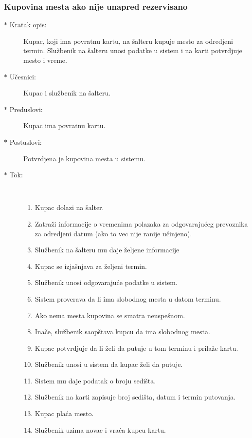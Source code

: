 \subsubsection{Kupovina mesta ako nije unapred rezervisano}
\begin{description}
	\item[$\ast$ Kratak opis: ] Kupac, koji ima povratnu kartu, na \v salteru kupuje mesto za odredjeni termin. Slu\v zbenik na \v salteru unosi podatke u sistem i na karti potvrdjuje mesto i vreme.
	\item[$\ast$ U\v cesnici: ] Kupac i slu\v zbenik na \v salteru.
	\item[$\ast$ Preduslovi: ] Kupac ima povratnu kartu.
	\item[$\ast$ Postuslovi: ] Potvrdjena je kupovina mesta u sistemu.
	\item[$\ast$ Tok: ] \ \\
	\begin{enumerate}
		\item Kupac dolazi na \v salter.
		\item Zatra\v zi informacije o vremenima polazaka za odgovaraju\'ceg prevoznika za odredjeni datum (ako to vec nije ranije u\v cinjeno).
		\item Slu\v zbenik na \v salteru mu daje \v zeljene informacije
		\item Kupac se izja\v snjava za \v zeljeni termin.
		\item Slu\v zbenik unosi odgovaraju\'ce podatke u sistem.
		\item Sistem proverava da li ima slobodnog mesta u datom terminu.
		\item Ako nema mesta kupovina se smatra neuspe\v snom.
		\item Ina\v ce, slu\v zbenik saop\v stava kupcu da ima slobodnog mesta.
		\item Kupac potvrdjuje da li \v zeli da putuje u tom terminu i prila\v ze kartu.
		\item Slu\v zbenik unosi u sistem da kupac \v zeli da putuje.
		\item Sistem mu daje podatak o broju sedi\v sta.
		\item Slu\v zbenik na karti zapisuje broj sedi\v sta, datum i termin putovanja.
		\item Kupac pla\'ca mesto.
		\item Slu\v zbenik uzima novac i vra\'ca kupcu kartu.
	\end{enumerate}
\end{description}


